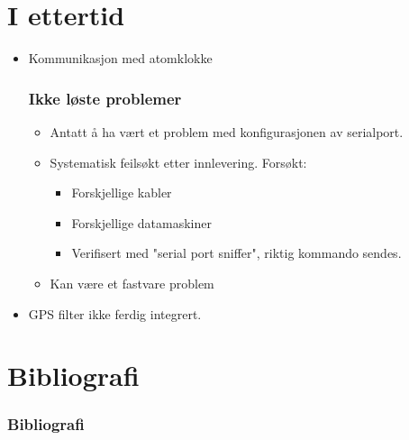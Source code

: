 \documentclass[xcolor=table]{beamer}
\begin{document}
\section{I ettertid}
\begin{frame}
  \begin{itemize}
  \item Kommunikasjon med atomklokke
    \frametitle{Ikke løste problemer}
    \begin{itemize}
      \item Antatt å ha vært et problem med konfigurasjonen av serialport.
      \item Systematisk feilsøkt etter innlevering. Forsøkt:
      \begin{itemize}
        \item Forskjellige kabler
        \item Forskjellige datamaskiner
        \item Verifisert med "serial port sniffer", riktig kommando sendes.
      \end{itemize}
      \item Kan være et fastvare problem
    \end{itemize}
  \item GPS filter ikke ferdig integrert.
  \end{itemize}
\end{frame}

\section{Bibliografi}
\begin{frame}[allowframebreaks]%
  \frametitle{Bibliografi}
  \printbibliography[heading=bibintoc]
\end{frame}
\end{document}

